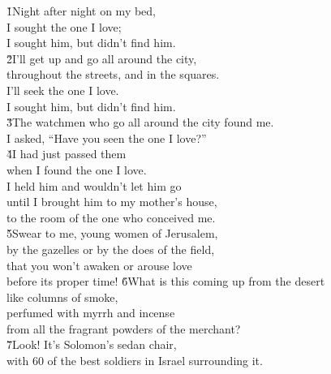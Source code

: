 \begin{poetry}
\poeml {}
\v{1}Night after night on my bed, \\
\poeml I sought the one I love; \\
\poeml I sought him, but didn't find him. \\
\poeml \v{2}I'll get up and go all around the city, \\
\poemll    throughout the streets, and in the squares. \\
\poeml I'll seek the one I love. \\
\poemll    I sought him, but didn't find him. \\
\poeml \v{3}The watchmen who go all around the city found me. \\
\poemll    I asked, ``Have you seen the one I love?'' \\
\poeml \v{4}I had just passed them \\
\poemll    when I found the one I love. \\
\poeml I held him and wouldn't let him go \\
\poemll    until I brought him to my mother's house, \\
\poemlll       to the room of the one who conceived me. \\
\poeml \v{5}Swear to me, young women of Jerusalem, \\
\poemll    by the gazelles or by the does of the field, \\
\poeml that you won't awaken or arouse love \\
\poemll    before its proper time!
\poeml \v{6}What is this coming up from the desert \\
\poemll    like columns of smoke, \\
\poeml perfumed with myrrh and incense \\
\poemll    from all the fragrant powders of the merchant? \\
\poeml \v{7}Look! It's Solomon's sedan chair, \\
\poemll    with 60 of the best soldiers in Israel surrounding it. \\

\end{poetry}
